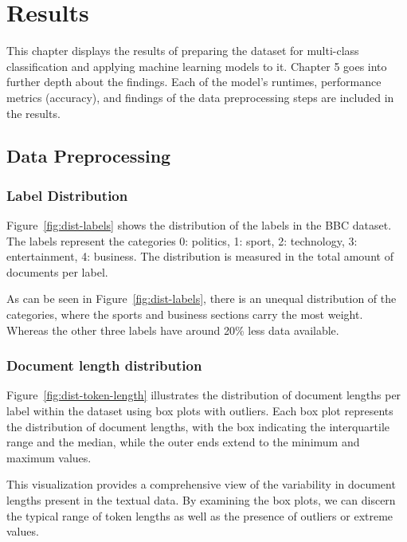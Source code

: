 \chapter{Results}

This chapter displays the results of preparing the dataset for multi-class classification and applying machine learning models to it. Chapter 5 goes into further depth about the findings. Each of the model’s runtimes, performance metrics (accuracy), and findings of the data preprocessing steps are included in the results. 

\section{Data Preprocessing}
\subsection{Label Distribution}


Figure~\ref{fig:dist-labels} shows the distribution of the labels in the BBC dataset. The labels represent the categories 0: politics, 1: sport, 2: technology, 3: entertainment, 4: business. The distribution is measured in the total amount of documents per label.

As can be seen in Figure~\ref{fig:dist-labels}, there is an unequal distribution of the categories, where the sports and business sections carry the most weight. Whereas the other three labels have around 20\% less data available.

\subsection{Document length distribution}


Figure~\ref{fig:dist-token-length} illustrates the distribution of document lengths per label within the dataset using box plots with outliers. Each box plot represents the distribution of document lengths, with the box indicating the interquartile range and the median, while the outer ends extend to the minimum and maximum values.

This visualization provides a comprehensive view of the variability in document lengths present in the textual data. By examining the box plots, we can discern the typical range of token lengths as well as the presence of outliers or extreme values.

